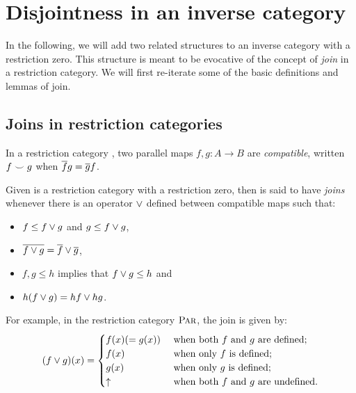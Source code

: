 \section{Disjointness in an inverse category} %
\label{sec:disjointness_in_an_inverse_category}
In the following, we will add two related structures to an inverse category with a
restriction zero. This structure is meant to be evocative of the concept of \emph{join} in a
restriction category. We will first re-iterate some of the basic definitions and lemmas of
join.
\subsection{Joins in restriction categories} %
\label{sub:joins_in_restriction_categories}

\begin{definition}\label{def:compatible_maps}
  In a restriction category \R, two parallel maps $f,g:A\to B$ are \emph{compatible}, written
  $f\smile g$ when $\overline{f}g = \overline{g}f$.
\end{definition}

\begin{definition}\label{def:joins}
  Given \R is a restriction category with a restriction zero, then \R is said to have \emph{joins}
  whenever there is an operator $\vee$ defined between compatible maps such that:
  \begin{itemize}
    \item $f \le f \vee g$ and $g \le f \vee g$,
    \item $\overline{f\vee g} = \overline{f}\vee \overline{g}$,
    \item $f,g \le h$ implies that $f\vee g \le h$ and
    \item $h(f\vee g) = h f \vee h g$.
  \end{itemize}
\end{definition}

For example, in the restriction category $\textsc{Par}$, the join is given by:
\[(f \vee g) (x) = \begin{cases}
  f(x)( = g(x))& \text{ when both $f$ and $g$ are defined;}\\
  f(x)& \text{ when only $f$ is defined;}\\
  g(x)& \text{ when only $g$ is defined;}\\
  \uparrow & \text{ when both $f$ and $g$ are undefined.}
\end{cases}
\]

